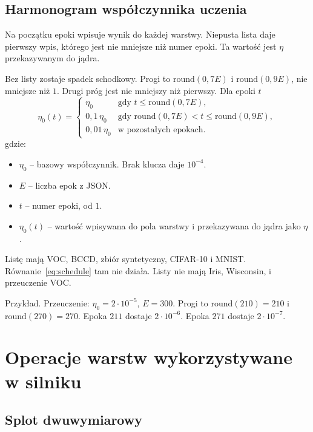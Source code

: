 \subsection{Harmonogram współczynnika uczenia}

Na początku epoki  wpisuje wynik do  każdej warstwy. Niepusta lista  daje pierwszy wpis, którego  jest nie mniejsze niż numer epoki. Ta wartość jest \(\eta\) przekazywanym do jądra.

Bez listy zostaje spadek schodkowy. Progi to \(\mathrm{round}(0{,}7E)\) i \(\mathrm{round}(0{,}9E)\), nie mniejsze niż \(1\). Drugi próg jest nie mniejszy niż pierwszy. Dla epoki \(t\)
\begin{equation}
\label{eq:schedule}
\eta_0(t) =
\begin{cases}
\eta_0 & \text{gdy } t \le \mathrm{round}(0{,}7E),\\
0{,}1\,\eta_0 & \text{gdy } \mathrm{round}(0{,}7E) < t \le \mathrm{round}(0{,}9E),\\
0{,}01\,\eta_0 & \text{w pozostałych epokach.}
\end{cases}
\end{equation}
gdzie:
\begin{itemize}
\item \(\eta_0\) -- bazowy współczynnik. Brak klucza  daje \(10^{-4}\).
\item \(E\) -- liczba epok z JSON.
\item \(t\) -- numer epoki, od \(1\).
\item \(\eta_0(t)\) -- wartość wpisywana do pola warstwy i przekazywana do jądra jako \(\eta\).
\end{itemize}

Listę  mają VOC, BCCD, zbiór syntetyczny, CIFAR-10 i MNIST. Równanie~\eqref{eq:schedule} tam nie działa. Listy nie mają Iris, Wisconsin,  i przeuczenie VOC.

Przykład. Przeuczenie: \(\eta_0 = 2 \cdot 10^{-5}\), \(E = 300\). Progi to \(\mathrm{round}(210) = 210\) i \(\mathrm{round}(270) = 270\). Epoka \(211\) dostaje \(2 \cdot 10^{-6}\). Epoka \(271\) dostaje \(2 \cdot 10^{-7}\).

\section{Operacje warstw wykorzystywane w silniku}

\subsection{Splot dwuwymiarowy}

